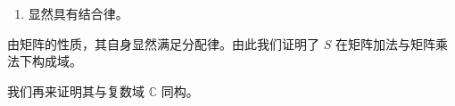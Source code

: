 \begin{question}
\begin{solution}
\begin{enumerate}
  \[
  \begin{pmatrix}a&b\\-b&a\end{pmatrix}
  \begin{pmatrix}c&d\\-d&c\end{pmatrix}
  =\begin{pmatrix}ac-bd&bc+ad\\-bc-ad&ac-bd\end{pmatrix},
  \]
  \[
  \begin{pmatrix}c&d\\-d&c\end{pmatrix}
  \begin{pmatrix}a&b\\-b&a\end{pmatrix}
  =\begin{pmatrix}ac-bd&bc+ad\\-bc-ad&ac-bd\end{pmatrix};
  \]
  \item 显然具有结合律。
\end{enumerate}

由矩阵的性质，其自身显然满足分配律。由此我们证明了 \(S\) 在矩阵加法与矩阵乘法下构成域。

我们再来证明其与复数域 \(\mathbb{C}\) 同构。


\end{solution}
\end{question}
